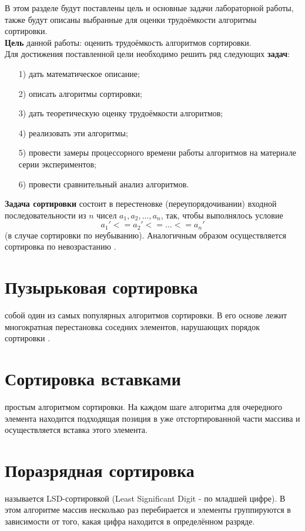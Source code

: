В этом разделе будут поставлены цель и основные задачи лабораторной работы, также будут описаны выбранные для оценки трудоёмкости алгоритмы сортировки.\\

\textbf{Цель} данной работы: оценить трудоёмкость алгоритмов сортировки.\\

Для достижения поставленной цели необходимо решить ряд следующих \textbf{задач}:
\begin{enumerate}
\item[1)] дать математическое описание;
\item[2)] описать алгоритмы сортировки;
\item[3)] дать теоретическую оценку трудоёмкости алгоритмов;
\item[4)] реализовать эти алгоритмы;
\item[5)] провести замеры процессорного времени работы алгоритмов на материале серии экспериментов;
\item[6)] провести сравнительный анализ алгоритмов.
\end{enumerate}

\textbf{Задача сортировки} состоит в перестеновке (переупорядочивании) входной последовательности из $n$ чисел ${a_1, a_2, ..., a_n}$, так, чтобы выполнялось условие
\begin{equation}
	a_1' <= a_2' <= ... <= a_n'
\end{equation} (в случае сортировки по неубыванию). Аналогичным образом осуществляется сортировка по невозрастанию \cite{Kormen}.

\section{Пузырьковая сортировка}
 собой один из самых популярных алгоритмов сортировки. В его основе лежит многократная перестановка соседних элементов, нарушающих порядок сортировки \cite{Kormen}.

\section{Сортировка вставками}
 простым алгоритмом сортировки. На каждом шаге алгоритма для очередного элемента находится подходящая позиция в уже отстортированной части массива и осуществляется вставка этого элемента. 

\section{Поразрядная сортировка}
 называется LSD-сортировкой (Least Significant Digit - по младшей цифре). В этом алгоритме массив несколько раз перебирается и элементы группируются в зависимости от того, какая цифра находится в определённом разряде. 

